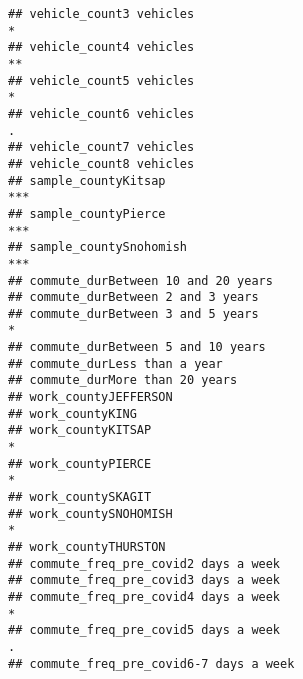 \documentclass[
]{article}
\begin{document}
\begin{verbatim}
## vehicle_count3 vehicles                                                                     *  
## vehicle_count4 vehicles                                                                     ** 
## vehicle_count5 vehicles                                                                     *  
## vehicle_count6 vehicles                                                                     .  
## vehicle_count7 vehicles                                                                        
## vehicle_count8 vehicles                                                                        
## sample_countyKitsap                                                                         ***
## sample_countyPierce                                                                         ***
## sample_countySnohomish                                                                      ***
## commute_durBetween 10 and 20 years                                                             
## commute_durBetween 2 and 3 years                                                               
## commute_durBetween 3 and 5 years                                                            *  
## commute_durBetween 5 and 10 years                                                              
## commute_durLess than a year                                                                    
## commute_durMore than 20 years                                                                  
## work_countyJEFFERSON                                                                           
## work_countyKING                                                                                
## work_countyKITSAP                                                                           *  
## work_countyPIERCE                                                                           *  
## work_countySKAGIT                                                                              
## work_countySNOHOMISH                                                                        *  
## work_countyTHURSTON                                                                            
## commute_freq_pre_covid2 days a week                                                            
## commute_freq_pre_covid3 days a week                                                            
## commute_freq_pre_covid4 days a week                                                         *  
## commute_freq_pre_covid5 days a week                                                         .  
## commute_freq_pre_covid6-7 days a week                                                          

\end{verbatim}
\end{document}
